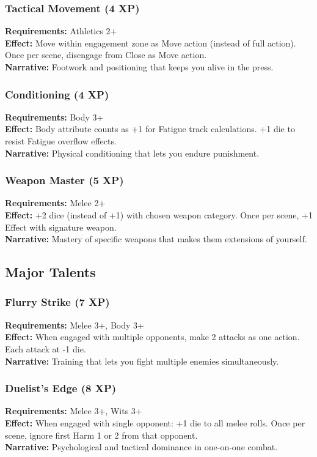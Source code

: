 \subsubsection{Tactical Movement (4 XP)}
\textbf{Requirements:} Athletics 2+ \\
\textbf{Effect:} Move within engagement zone as Move action (instead of full action). Once per scene, disengage from Close as Move action. \\
\textbf{Narrative:} Footwork and positioning that keeps you alive in the press.

\subsubsection{Conditioning (4 XP)}
\textbf{Requirements:} Body 3+ \\
\textbf{Effect:} Body attribute counts as +1 for Fatigue track calculations. +1 die to resist Fatigue overflow effects. \\
\textbf{Narrative:} Physical conditioning that lets you endure punishment.

\subsubsection{Weapon Master (5 XP)}
\textbf{Requirements:} Melee 2+ \\
\textbf{Effect:} +2 dice (instead of +1) with chosen weapon category. Once per scene, +1 Effect with signature weapon. \\
\textbf{Narrative:} Mastery of specific weapons that makes them extensions of yourself.

\subsection{Major Talents}

\subsubsection{Flurry Strike (7 XP)}
\textbf{Requirements:} Melee 3+, Body 3+ \\
\textbf{Effect:} When engaged with multiple opponents, make 2 attacks as one action. Each attack at -1 die. \\
\textbf{Narrative:} Training that lets you fight multiple enemies simultaneously.

\subsubsection{Duelist's Edge (8 XP)}
\textbf{Requirements:} Melee 3+, Wits 3+ \\
\textbf{Effect:} When engaged with single opponent: +1 die to all melee rolls. Once per scene, ignore first Harm 1 or 2 from that opponent. \\
\textbf{Narrative:} Psychological and tactical dominance in one-on-one combat.

